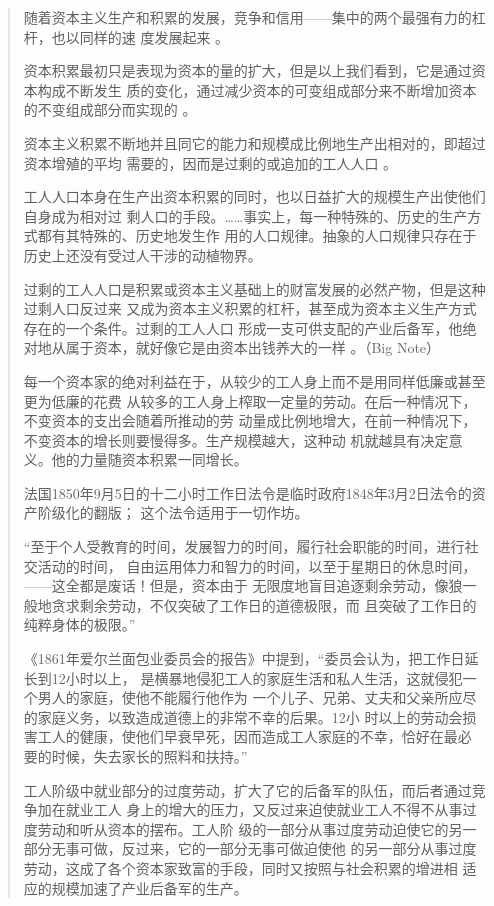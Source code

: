 \begin{quotation}
随着资本主义生产和积累的发展，竞争和信用——集中的两个最强有力的杠杆，也以同样的速
度发展起来 。

资本积累最初只是表现为资本的量的扩大，但是以上我们看到，它是通过资本构成不断发生
质的变化，通过减少资本的可变组成部分来不断增加资本的不变组成部分而实现的
 。

资本主义积累不断地并且同它的能力和规模成比例地生产出相对的，即超过资本增殖的平均
需要的，因而是过剩的或追加的工人人口 。

工人人口本身在生产出资本积累的同时，也以日益扩大的规模生产出使他们自身成为相对过
剩人口的手段。……事实上，每一种特殊的、历史的生产方式都有其特殊的、历史地发生作
用的人口规律。抽象的人口规律只存在于历史上还没有受过人干涉的动植物界。

过剩的工人人口是积累或资本主义基础上的财富发展的必然产物，但是这种过剩人口反过来
又成为资本主义积累的杠杆，甚至成为资本主义生产方式存在的一个条件。过剩的工人人口
形成一支可供支配的产业后备军，他绝对地从属于资本，就好像它是由资本出钱养大的一样
 。（Big Note）



每一个资本家的绝对利益在于，从较少的工人身上而不是用同样低廉或甚至更为低廉的花费
从较多的工人身上榨取一定量的劳动。在后一种情况下，不变资本的支出会随着所推动的劳
动量成比例地增大，在前一种情况下，不变资本的增长则要慢得多。生产规模越大，这种动
机就越具有决定意义。他的力量随资本积累一同增长。
\bigskip

法国1850年9月5日的十二小时工作日法令是临时政府1848年3月2日法令的资产阶级化的翻版；
这个法令适用于一切作坊。

“至于个人受教育的时间，发展智力的时间，履行社会职能的时间，进行社交活动的时间，
自由运用体力和智力的时间，以至于星期日的休息时间，——这全都是废话！但是，资本由于
无限度地盲目追逐剩余劳动，像狼一般地贪求剩余劳动，不仅突破了工作日的道德极限，而
且突破了工作日的纯粹身体的极限。”

《1861年爱尔兰面包业委员会的报告》中提到，“委员会认为，把工作日延长到12小时以上，
是横暴地侵犯工人的家庭生活和私人生活，这就侵犯一个男人的家庭，使他不能履行他作为
一个儿子、兄弟、丈夫和父亲所应尽的家庭义务，以致造成道德上的非常不幸的后果。12小
时以上的劳动会损害工人的健康，使他们早衰早死，因而造成工人家庭的不幸，恰好在最必
要的时候，失去家长的照料和扶持。”

工人阶级中就业部分的过度劳动，扩大了它的后备军的队伍，而后者通过竞争加在就业工人
身上的增大的压力，又反过来迫使就业工人不得不从事过度劳动和听从资本的摆布。工人阶
级的一部分从事过度劳动迫使它的另一部分无事可做，反过来，它的一部分无事可做迫使他
的另一部分从事过度劳动，这成了各个资本家致富的手段，同时又按照与社会积累的增进相
适应的规模加速了产业后备军的生产。


\end{quotation}
